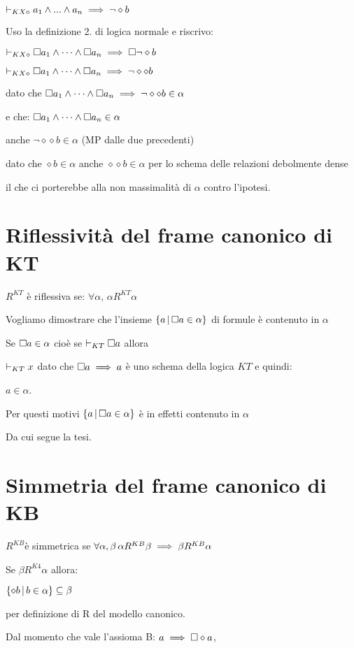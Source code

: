 %
$\vdash_{KX\diamond}a_{1}\wedge...\wedge a_{n}\implies\neg\diamond b$

Uso la definizione 2. di logica normale e riscrivo:

$\vdash_{KX\diamond}\square a_{1}\wedge\dots\wedge\square a_{n}\implies\square\neg\diamond b$

$\vdash_{KX\diamond}\square a_{1}\wedge\dots\wedge\square a_{n}\implies\neg\diamond\diamond b$

dato che $\square a_{1}\wedge\dots\wedge\square a_{n}\implies\neg\diamond\diamond b\in\alpha$

e che: $\square a_{1}\wedge\dots\wedge\square a_{n}\in\alpha$

anche $\neg\diamond\diamond b\in\alpha$ (MP dalle due precedenti)

dato che $\diamond b\in\alpha$ anche $\diamond\diamond b\in\alpha$
per lo schema delle relazioni debolmente dense

il che ci porterebbe alla non massimalità di $\alpha$ contro l'ipotesi.
\lightning


\section{Riflessività del frame canonico di KT}

$R^{KT}$ è riflessiva se: $\forall\alpha,\,\alpha R^{KT}\alpha$

Vogliamo dimostrare che l'insieme $\{a\,|\,\square a\in\alpha\}$ di formule
è contenuto in $\alpha$

Se $\square a\in\alpha$ cioè se $\vdash_{KT}\square a$ allora

$\vdash_{KT}x$ dato che $\square a\implies a$ è uno schema della
logica $KT$ e quindi:

$a\in\alpha$.

Per questi motivi $\{a\,|\,\square a\in\alpha\}$ è in effetti contenuto
in $\alpha$

Da cui segue la tesi.


\section{Simmetria del frame canonico di KB}

$R^{KB}$è simmetrica se $\forall\alpha,\beta\,\alpha R^{KB}\beta\implies\beta R^{KB}\alpha$

Se $\beta R^{K4}\alpha$ allora:

$\{\diamond b\,|\, b\in\alpha\}\subseteq\beta$

per definizione di R del modello canonico.

Dal momento che vale l'assioma B: $a\implies\square\diamond a$,

